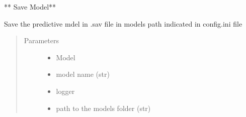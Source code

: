 \documentclass[letterpaper,10pt,english]{sphinxmanual}
\begin{document}
\begin{fulllineitems}
\label{\detokenize{index:dummy_project_utils.save_model}}
\sphinxAtStartPar
** Save Model**

\sphinxAtStartPar
Save the predictive mdel in .sav file in models path indicated in config.ini file
\begin{quote}\begin{description}
\item[{Parameters}] \leavevmode\begin{itemize}
\item {} 
\sphinxAtStartPar
{} \textendash{} Model

\item {} 
\sphinxAtStartPar
{} \textendash{} model name (str)

\item {} 
\sphinxAtStartPar
{} \textendash{} logger

\item {} 
\sphinxAtStartPar
{} \textendash{} path to the models folder (str)

\end{itemize}

\end{description}\end{quote}

\end{fulllineitems}

\end{document}
